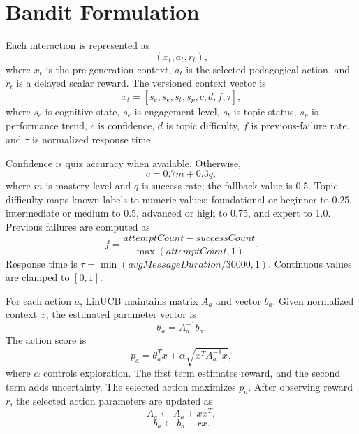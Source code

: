 \documentclass[conference]{IEEEtran}
\begin{document}
\section{Bandit Formulation}

Each interaction is represented as
\begin{equation}
(x_t, a_t, r_t),
\end{equation}
where $x_t$ is the pre-generation context, $a_t$ is the selected pedagogical action, and $r_t$ is a delayed scalar reward. The versioned context vector is
\begin{equation}
x_t = [s_c, s_e, s_t, s_p, c, d, f, \tau],
\end{equation}
where $s_c$ is cognitive state, $s_e$ is engagement level, $s_t$ is topic status, $s_p$ is performance trend, $c$ is confidence, $d$ is topic difficulty, $f$ is previous-failure rate, and $\tau$ is normalized response time.

Confidence is quiz accuracy when available. Otherwise,
\begin{equation}
c = 0.7m + 0.3q,
\end{equation}
where $m$ is mastery level and $q$ is success rate; the fallback value is 0.5. Topic difficulty maps known labels to numeric values: foundational or beginner to 0.25, intermediate or medium to 0.5, advanced or high to 0.75, and expert to 1.0. Previous failures are computed as
\begin{equation}
f = \frac{attemptCount - successCount}{\max(attemptCount, 1)}.
\end{equation}
Response time is $\tau = \min(avgMessageDuration/30000, 1)$. Continuous values are clamped to $[0, 1]$.

For each action $a$, LinUCB maintains matrix $A_a$ and vector $b_a$. Given normalized context $x$, the estimated parameter vector is
\begin{equation}
\theta_a = A_a^{-1} b_a.
\end{equation}
The action score is
\begin{equation}
p_a = \theta_a^T x + \alpha \sqrt{x^T A_a^{-1}x},
\end{equation}
where $\alpha$ controls exploration. The first term estimates reward, and the second term adds uncertainty. The selected action maximizes $p_a$. After observing reward $r$, the selected action parameters are updated as
\begin{equation}
A_a \leftarrow A_a + xx^T,
\end{equation}
\begin{equation}
b_a \leftarrow b_a + rx.
\end{equation}
\end{document}
